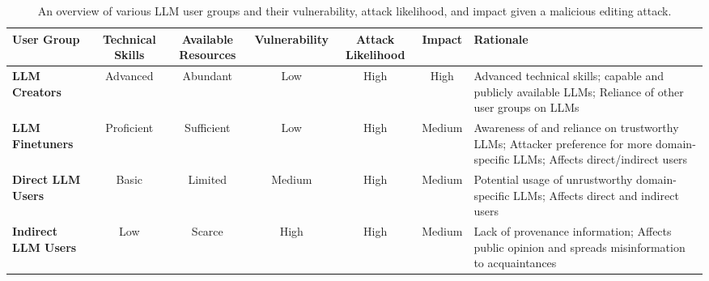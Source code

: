 \begin{table*}[!htp]\centering
\caption{An overview of various LLM user groups and their vulnerability, attack likelihood, and impact given a malicious editing attack.}\label{tab:groups}
\tiny
\begin{tabular}{lcccccp{5.5cm}}\toprule
\textbf{User Group} &\textbf{Technical Skills} &\textbf{Available Resources} &\textbf{Vulnerability} &\textbf{Attack Likelihood} &\textbf{Impact} &\textbf{Rationale} \\\midrule
\textbf{LLM Creators} &Advanced &Abundant &Low &High &High &Advanced technical skills; capable and publicly available LLMs; Reliance of other user groups on LLMs \\  \midrule
\textbf{LLM Finetuners} &Proficient &Sufficient &Low &High &Medium &Awareness of and reliance on trustworthy LLMs; Attacker preference for more domain-specific LLMs; Affects direct/indirect users \\  \midrule
\textbf{Direct LLM Users} &Basic &Limited &Medium &High &Medium &Potential usage of unrustworthy domain-specific LLMs; Affects direct and indirect users \\  \midrule
\textbf{Indirect LLM Users} &Low &Scarce &High &High &Medium &Lack of provenance information; Affects public opinion and spreads misinformation to acquaintances \\
\bottomrule
\end{tabular}
\end{table*}
